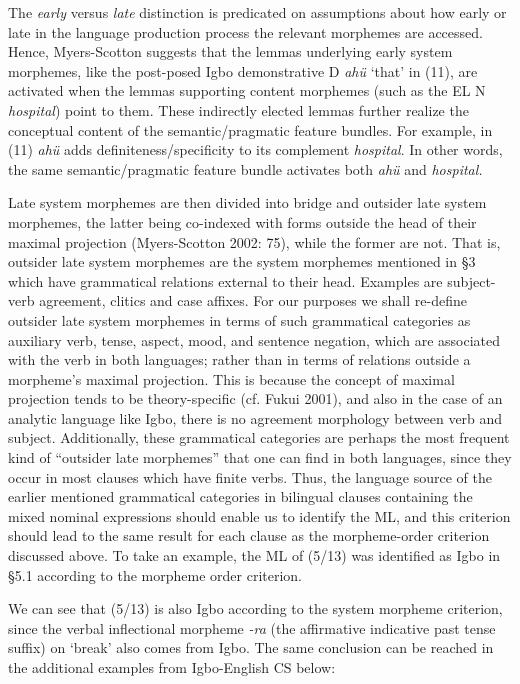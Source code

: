 \documentclass[output=paper]{langsci/langscibook}
\begin{document}
The \textit{early} versus \textit{late} distinction is predicated on assumptions about how early or late in the language production process the relevant morphemes are accessed. Hence, Myers-Scotton suggests that the lemmas underlying early system morphemes, like the post-posed Igbo demonstrative D \textit{ahü }‘that’ in (11), are activated when the lemmas supporting content morphemes (such as the EL N \textit{hospital}) point to them. These indirectly elected lemmas further realize the conceptual content of the semantic/pragmatic feature bundles. For example, in (11) \textit{ahü }adds definiteness/specificity to its complement \textit{hospital}. In other words, the same semantic/pragmatic feature bundle activates both \textit{ahü }and \textit{hospital. }

Late system morphemes are then divided into bridge and outsider late system morphemes, the latter being co-indexed with forms outside the head of their maximal projection (Myers-Scotton 2002: 75), while the former are not. That is, outsider late system morphemes are the system morphemes mentioned in §3 which have grammatical relations external to their head. Examples are subject-verb agreement, clitics and case affixes. For our purposes we shall re-define outsider late system morphemes in terms of such grammatical categories as auxiliary verb, tense, aspect, mood, and sentence negation, which are associated with the verb in both languages; rather than in terms of relations outside a morpheme’s maximal projection. This is because the concept of maximal projection tends to be theory-specific (cf. Fukui 2001), and also in the case of an analytic language like Igbo, there is no agreement morphology between verb and subject. Additionally, these grammatical categories are perhaps the most frequent kind of “outsider late morphemes” that one can find in both languages, since they occur in most clauses which have finite verbs. Thus, the language source of the earlier mentioned grammatical categories in bilingual clauses containing the mixed nominal expressions should enable us to identify the ML, and this criterion should lead to the same result for each clause as the morpheme-order criterion discussed above. To take an example, the ML of (5/13) was identified as Igbo in §5.1 according to the morpheme order criterion.

We can see that (5/13) is also Igbo according to the system morpheme criterion, since the verbal inflectional morpheme \textit{{}-ra} (the affirmative indicative past tense suffix) on ‘break’ also comes from Igbo. The same conclusion can be reached in the additional examples from Igbo-English CS below: 
\end{document}
